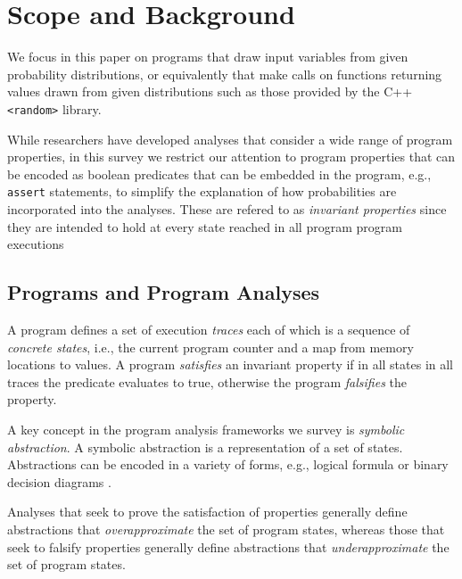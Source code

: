 \section{Scope and Background}
\label{sec:background}


We focus in this paper on programs that draw input variables
from given probability distributions, or equivalently that make
calls on functions returning values drawn from given distributions
such as those provided by the C++ \texttt{<random>} library.

While researchers have developed analyses that consider a wide
range of program properties, in this survey
we restrict our attention to program
properties that can be encoded as boolean predicates that
can be embedded in the program,
e.g., \texttt{assert} statements, to simplify the explanation
of how probabilities are incorporated into the analyses.
These are refered to as \textit{invariant properties} since
they are intended to hold at every state reached
in all program program executions

\subsection{Programs and Program Analyses}
A program defines a set of execution \textit{traces} each of
which is a sequence of \textit{concrete states}, i.e., 
the current program counter and a map from memory locations to values.
A program \textit{satisfies} an invariant property if in all states in
all traces the predicate evaluates to true, otherwise the program
\textit{falsifies} the property.

A key concept in the program analysis frameworks we survey is
\textit{symbolic abstraction}.  A symbolic abstraction is a 
representation of a set of states.  Abstractions can be encoded
in a variety of forms, e.g., logical formula or binary
decision diagrams \cite{BDD}.  

Analyses that seek to prove the satisfaction of properties generally
define abstractions that \textit{overapproximate} the set of program
states, whereas those that seek to falsify properties generally define
abstractions that \textit{underapproximate} the set of program states.

